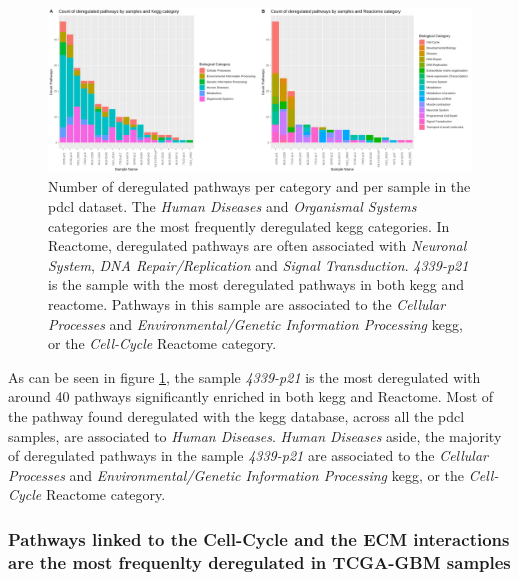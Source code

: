 \begin{figure}
    \includegraphics[width=\textwidth]{img/barplot-categ-pdcl}
    \caption{
        Number of deregulated pathways per category and per sample in the \acrshort{pdcl} dataset.
        The  \textit{Human Diseases} and \textit{Organismal Systems} categories are the most frequently deregulated \acrshort{kegg} categories.
        In Reactome, deregulated pathways are often associated with \textit{Neuronal System}, \textit{DNA Repair/Replication} and \textit{Signal Transduction}.
        \textit{4339-p21} is the sample with the most deregulated pathways in both \acrshort{kegg} and reactome.
        Pathways in this sample are associated to the \textit{Cellular Processes} and \textit{Environmental/Genetic Information Processing} \acrshort{kegg}, or the \textit{Cell-Cycle} Reactome category.
    }
    \label{fig:barplot-categ-pdcl}
\end{figure}

As can be seen in figure \ref*{fig:barplot-categ-pdcl}, the sample \textit{4339-p21} is the most deregulated with around 40 pathways significantly enriched in both \acrshort{kegg} and Reactome.
Most of the pathway found deregulated with the \acrshort{kegg} database, across all the \acrshort{pdcl} samples, are associated to \textit{Human Diseases}.
\textit{Human Diseases} aside, the majority of deregulated pathways in the sample \textit{4339-p21} are associated to the \textit{Cellular Processes} and \textit{Environmental/Genetic Information Processing} \acrshort{kegg}, or the \textit{Cell-Cycle} Reactome category.

\subsubsection{Pathways linked to the Cell-Cycle and the ECM interactions are the most frequenlty deregulated in TCGA-GBM samples}

